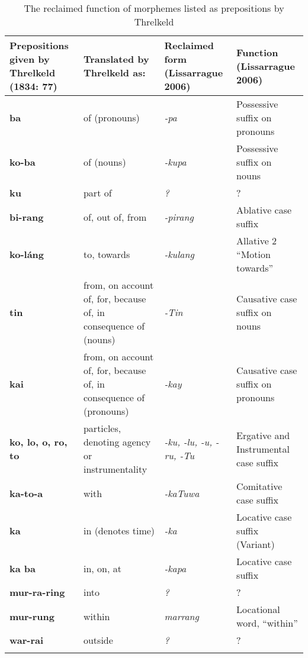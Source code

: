 \begin{table}
\small
    \begin{tabularx}{\textwidth}{QQQQ}
        \lsptoprule
        Prepositions given by Threlkeld (1834: 77) & Translated by Threlkeld as: & Reclaimed form (Lissarrague 2006) & Function (Lissarrague 2006)  \\
        \midrule
        \textbf{ba}	& of (pronouns)	& \textit{-pa} & Possessive suffix on pronouns \\
        \textbf{ko-ba} &	of (nouns) & \textit{-kupa} &	Possessive suffix on nouns \\
        \textbf{ku}	& part of &	\textit{?} &	? \\
        \textbf{bi-rang} &	of, out of, from &	\textit{-pirang}	 & Ablative case suffix \\
        \textbf{ko-láng} &	to, towards	& \textit{-kulang} &	Allative 2 “Motion towards” \\
        \textbf{tin} &	from, on account of, for, because of, in consequence of (nouns) &	\textit{-Tin} &	Causative case suffix on nouns \\
        \textbf{kai} &	from, on account of, for, because of, in consequence of (pronouns) &	\textit{-kay} &	Causative case suffix on pronouns \\
        \textbf{ko, lo, o, ro, to} &	particles, denoting agency or instrumentality &	\textit{-ku, -lu, -u, -ru, -Tu} &	Ergative and Instrumental case suffix \\
        \textbf{ka-to-a} &	with &	\textit{-kaTuwa}	& Comitative case suffix \\
        \textbf{ka}	& in (denotes time) & \textit{-ka}	 & Locative case suffix (Variant) \\
        \textbf{ka ba} &	in, on, at & \textit{-kapa} & Locative case suffix \\
        \textbf{mur-ra-ring} &	into &	\textit{?} &	? \\
        \textbf{mur-rung} &	within &	\textit{marrang}	& Locational word, “within” \\
        \textbf{war-rai} &	outside	& \textit{?}	& ? \\
        \lspbottomrule
    \end{tabularx}
    \caption{The reclaimed function of morphemes listed as prepositions by Threlkeld}
    \label{tab:chap3:morphemes}
	\label{fig:3:40}
\end{table}

